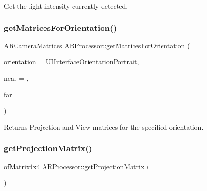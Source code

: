 Get the light intensity currently detected. 

\mbox{\label{class_a_r_processor_abcd684d805e880aed72c2eb56a65978f}} 
\subsubsection{\texorpdfstring{get\+Matrices\+For\+Orientation()}{getMatricesForOrientation()}}
{\footnotesize\ttfamily \hyperlink{struct_a_r_common_1_1_a_r_camera_matrices}{A\+R\+Camera\+Matrices} A\+R\+Processor\+::get\+Matrices\+For\+Orientation (\begin{DoxyParamCaption}\item[{U\+I\+Interface\+Orientation}]{orientation = {\ttfamily UIInterfaceOrientationPortrait},  }\item[{float}]{near = {},  }\item[{float}]{far = {} }\end{DoxyParamCaption})}



Returns Projection and View matrices for the specified orientation. 

\mbox{\label{class_a_r_processor_a0f7cf764c73a8fc3964be088156766ea}} 
\subsubsection{\texorpdfstring{get\+Projection\+Matrix()}{getProjectionMatrix()}}
{\footnotesize\ttfamily of\+Matrix4x4 A\+R\+Processor\+::get\+Projection\+Matrix (\begin{DoxyParamCaption}{ }\end{DoxyParamCaption})\hspace{0.3cm}{\ttfamily [inline]}}

\mbox{\label{class_a_r_processor_aa53d195b42b23d9208071692fd5ac28d}} 
